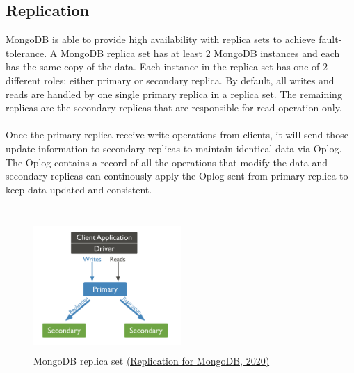 \documentclass[12pt]{article}
\begin{document}
\subsection{Replication}
MongoDB is able to provide high availability with replica sets to achieve fault-tolerance. A MongoDB replica set has at least 2 MongoDB instances and each has the same copy of the data. Each instance in the replica set has one of 2 different roles: either primary or secondary replica. By default, all writes and reads are handled by one single primary replica in a replica set. The remaining replicas are the secondary replicas that are responsible for read operation only.\\
\\
Once the primary replica receive write operations from clients, it will send those update information to secondary replicas to maintain identical data via Oplog. The Oplog contains a record of all the operations that modify the data and secondary replicas can continously apply the Oplog sent from primary replica to keep data updated and consistent.\\
\\
\begin{figure}
  \centering
  \includegraphics[width=0.5\textwidth, height=50mm]{img/replica.png}
  \caption{MongoDB replica set \hyperref[sec:reference]{(Replication for MongoDB, 2020)}}
  \label{fig:replica}
\end{figure}
\end{document}
